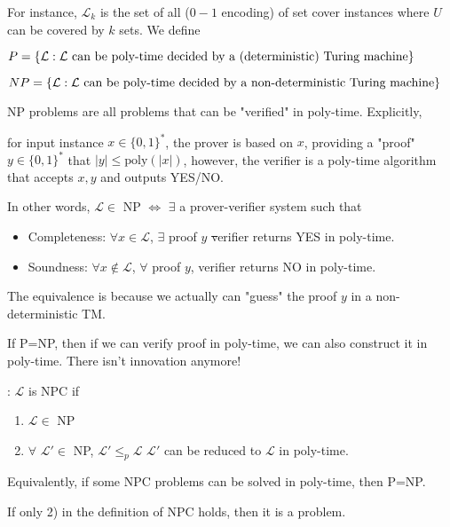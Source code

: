 For instance, $ \mathcal{L}_k $  is the set of all ($ 0-1 $ encoding) of set cover instances where  $ U  $ can be covered by  $ k  $ sets. We define 
\begin{center}
    $ \displaystyle P=\{\mathcal{L}:\mathcal{L}\text{ can be poly-time decided by a (deterministic) Turing machine}\} $ 
\end{center}
\begin{center}
    $ \displaystyle NP=\{\mathcal{L}:\mathcal{L}\text{ can be poly-time decided by a non-deterministic Turing machine}\} $
\end{center}

NP problems are all problems that can be "verified" in poly-time. Explicitly,

for input instance  $ x\in \{0,1\}^\ast $, the prover is based on  $ x $, providing a "proof"  $ y\in \{0,1\}^\ast $ that  $ |y| \leq \mathrm{poly}(|x|) $, however, the verifier is a poly-time algorithm that accepts   $ x,y  $ and outputs YES/NO.

In other words,  $ \mathcal{L}\in  $ NP  $ \Leftrightarrow $   $ \exists $ a prover-verifier system such that 
\begin{itemize}
    \item Completeness:  $ \forall x\in \mathcal{L} $,  $ \exists $ proof $ y $ \st verifier returns YES in poly-time.
    \item Soundness: $ \forall x\not\in \mathcal{L} $, $ \forall  $  proof  $ y $, verifier returns  NO in poly-time.     
\end{itemize} 
The equivalence is because we actually can "guess" the proof  $ y  $ in a non-deterministic TM.

If P=NP, then if we can verify  proof in poly-time, we can also construct it in poly-time. There isn't innovation anymore!

:  $ \mathcal{L} $ is NPC if 
\begin{enumerate}[label=\arabic*)]
    \item  $ \mathcal{L}\in  $ NP 
    \item  $ \forall  $  $ \mathcal{L}'\in  $ NP,  $ \mathcal{L}' \leq_p\mathcal{L} $ \ie  $ \mathcal{L}' $ can be reduced to  $ \mathcal{L} $ in poly-time.      
\end{enumerate} 

Equivalently, if some NPC problems can be solved in poly-time, then P=NP.

If only 2) in the definition of NPC holds, then it is a  problem.